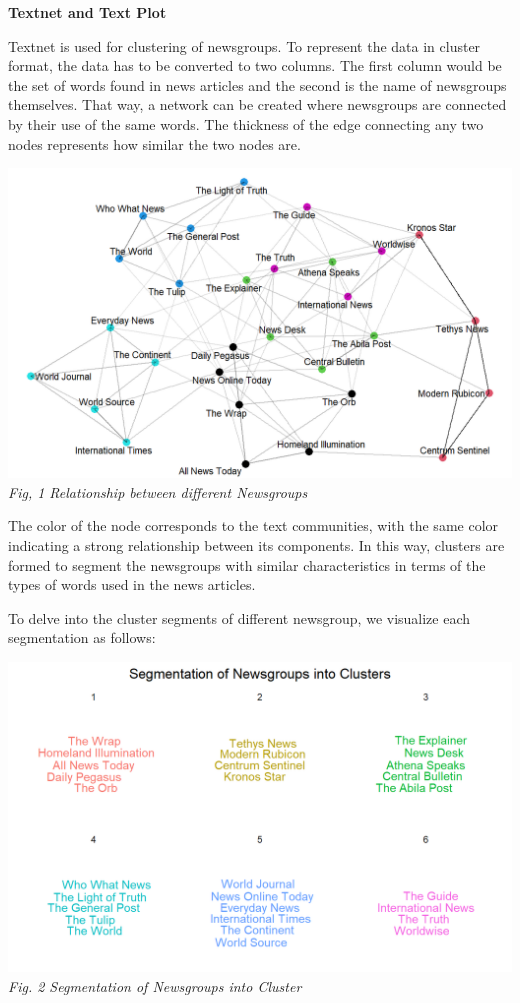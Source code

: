 \documentclass{acm_proc_article-sp}
\begin{document}
\textbf{Textnet and Text Plot}

Textnet is used for clustering of newsgroups. To represent the data in
cluster format, the data has to be converted to two columns. The first
column would be the set of words found in news articles and the second
is the name of newsgroups themselves. That way, a network can be created
where newsgroups are connected by their use of the same words. The
thickness of the edge connecting any two nodes represents how similar
the two nodes are.

\includegraphics{img/image02.png} \emph{Fig, 1 Relationship between
different Newsgroups}

The color of the node corresponds to the text communities, with the same
color indicating a strong relationship between its components. In this
way, clusters are formed to segment the newsgroups with similar
characteristics in terms of the types of words used in the news
articles.

To delve into the cluster segments of different newsgroup, we visualize
each segmentation as follows:

\includegraphics{img/image04.png} \emph{Fig. 2 Segmentation of
Newsgroups into Cluster}
\end{document}
